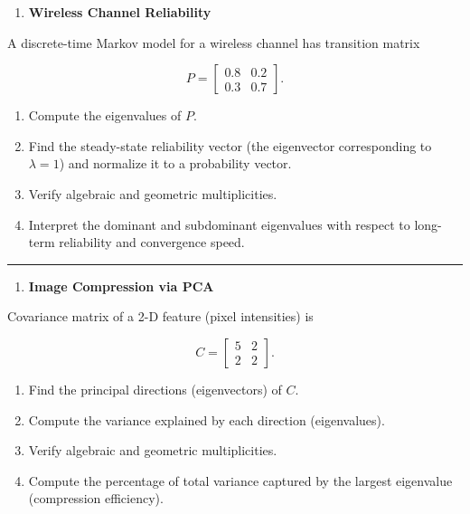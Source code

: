 \documentclass[
  letterpaper,
  DIV=11,
  numbers=noendperiod]{scrreprt}
\providecommand{\tightlist}{%
  \setlength{\itemsep}{0pt}\setlength{\parskip}{0pt}}
\begin{document}
\begin{enumerate}
\def\labelenumi{\arabic{enumi}.}
\setcounter{enumi}{1}
\tightlist
\item
  \textbf{Wireless Channel Reliability}
\end{enumerate}

A discrete-time Markov model for a wireless channel has transition
matrix

\[P = \begin{bmatrix}0.8 & 0.2 \\ 0.3 & 0.7\end{bmatrix}.\]

\begin{enumerate}
\def\labelenumi{(\alph{enumi})}
\item
  Compute the eigenvalues of \(P\).
\item
  Find the steady-state reliability vector (the eigenvector
  corresponding to \(\lambda=1\)) and normalize it to a probability
  vector.
\item
  Verify algebraic and geometric multiplicities.
\item
  Interpret the dominant and subdominant eigenvalues with respect to
  long-term reliability and convergence speed.
\end{enumerate}

\begin{center}\rule{0.5\linewidth}{0.5pt}\end{center}

\begin{enumerate}
\def\labelenumi{\arabic{enumi}.}
\setcounter{enumi}{2}
\tightlist
\item
  \textbf{Image Compression via PCA}
\end{enumerate}

Covariance matrix of a 2-D feature (pixel intensities) is

\[C = \begin{bmatrix}5 & 2 \\ 2 & 2\end{bmatrix}.\]

\begin{enumerate}
\def\labelenumi{(\alph{enumi})}
\item
  Find the principal directions (eigenvectors) of \(C\).
\item
  Compute the variance explained by each direction (eigenvalues).
\item
  Verify algebraic and geometric multiplicities.
\item
  Compute the percentage of total variance captured by the largest
  eigenvalue (compression efficiency).
\end{enumerate}
\end{document}
